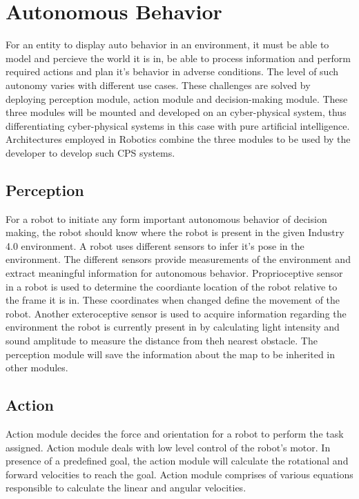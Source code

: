\section{Autonomous Behavior}
For an entity to display auto behavior in an environment, it must be able to model and percieve the world it is in, be able to process information
and perform required actions and plan it's behavior in adverse conditions. The level of such autonomy varies with different use cases. These challenges
are solved by deploying perception module, action module and decision-making module. These three modules will be mounted and developed on an cyber-physical
system, thus differentiating cyber-physical systems in this case with pure artificial intelligence. Architectures employed in Robotics combine the three modules
to be used by the developer to develop such CPS systems.
\subsection{Perception}
For a robot to initiate any form important autonomous behavior of decision making, the robot should know where the robot is present in the given Industry 4.0 environment. A robot uses different sensors to infer it's pose in the environment.
The different sensors provide measurements of the environment and extract meaningful information for autonomous behavior. Proprioceptive sensor in a robot is used to determine the coordiante location of the robot relative
to the frame it is in. These coordinates when changed define the movement of the robot. Another exteroceptive sensor is used to acquire information regarding the environment the
robot is currently present in by calculating light intensity and sound amplitude to measure the distance from theh nearest obstacle. The perception module will save the information about the map to be
inherited in other modules.
\subsection{Action}
Action module decides the force and orientation for a robot to perform the task assigned. Action module deals with low level control of the robot's motor. In presence of a predefined goal, 
the action module will calculate the rotational and forward velocities to reach the goal. Action module comprises of various equations responsible to calculate the linear and angular velocities.
